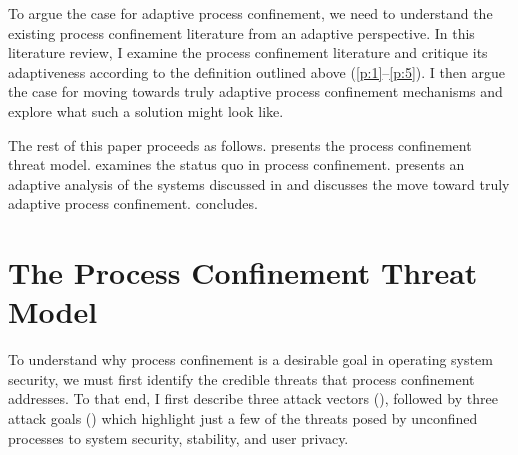\documentclass[dvipsnames, 12pt]{article}
\begin{document}
To argue the case for adaptive process confinement, we need to understand the
existing process confinement literature from an adaptive perspective. In this
literature review, I examine the process confinement literature and critique its
adaptiveness according to the definition outlined above (\ref{p:1}--\ref{p:5}).
I then argue the case for moving towards truly adaptive process confinement
mechanisms and explore what such a solution might look like.

The rest of this paper proceeds as follows.  presents the
process confinement threat model.   examines the status quo
in process confinement.   presents an adaptive analysis of the
systems discussed in  and discusses the move toward
truly adaptive process confinement.
 concludes.


\section{The Process Confinement Threat Model}
\label{sec:threat_model}

To understand why process confinement is a desirable goal in operating system
security, we must first identify the credible threats that process confinement
addresses. To that end, I first describe three attack vectors
(), followed by three attack goals ()
which highlight just a few of the threats posed by unconfined processes to
system security, stability, and user privacy.
\end{document}
